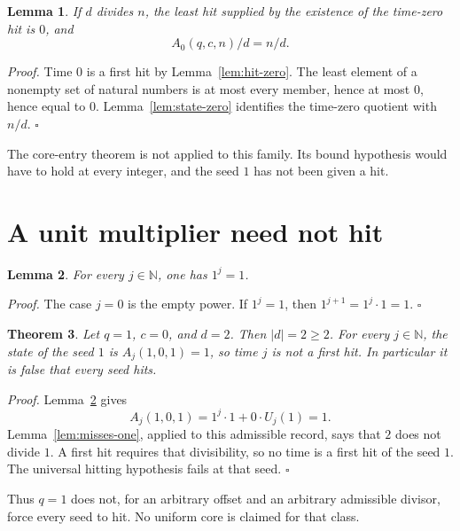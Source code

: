 \documentclass[11pt,letterpaper]{article}
\newcommand{\N}{\mathbb{N}}
\newtheorem{theorem}{Theorem}
\newtheorem{lemma}[theorem]{Lemma}
\newenvironment{proof}{\noindent\textit{Proof.}}{\hfill\(\square\)}
\begin{document}
\begin{lemma}
\label{lem:least-divisible}
If \(d\) divides \(n\), the least hit supplied by the existence of the time-zero hit is \(0\), and
\[
A_0(q,c,n)/d=n/d.
\]
\end{lemma}

\begin{proof}
Time \(0\) is a first hit by Lemma~\ref{lem:hit-zero}. The least element of a nonempty set of natural numbers is at most every member, hence at most \(0\), hence equal to \(0\). Lemma~\ref{lem:state-zero} identifies the time-zero quotient with \(n/d\).
\end{proof}

The core-entry theorem is not applied to this family. Its bound hypothesis would have to hold at every integer, and the seed \(1\) has not been given a hit.

\section{A unit multiplier need not hit}

\begin{lemma}
\label{lem:one-pow}
For every \(j\in\N\), one has \(1^j=1\).
\end{lemma}

\begin{proof}
The case \(j=0\) is the empty power. If \(1^j=1\), then \(1^{j+1}=1^j\cdot 1=1\).
\end{proof}

\begin{theorem}
\label{thm:unit-frozen}
Let \(q=1\), \(c=0\), and \(d=2\). Then \(\lvert d\rvert=2\ge 2\). For every \(j\in\N\), the state of the seed \(1\) is \(A_j(1,0,1)=1\), so time \(j\) is not a first hit. In particular it is false that every seed hits.
\end{theorem}

\begin{proof}
Lemma~\ref{lem:one-pow} gives
\[
A_j(1,0,1)=1^j\cdot 1+0\cdot U_j(1)=1.
\]
Lemma~\ref{lem:misses-one}, applied to this admissible record, says that \(2\) does not divide \(1\). A first hit requires that divisibility, so no time is a first hit of the seed \(1\). The universal hitting hypothesis fails at that seed.
\end{proof}

Thus \(q=1\) does not, for an arbitrary offset and an arbitrary admissible divisor, force every seed to hit. No uniform core is claimed for that class.
\end{document}
